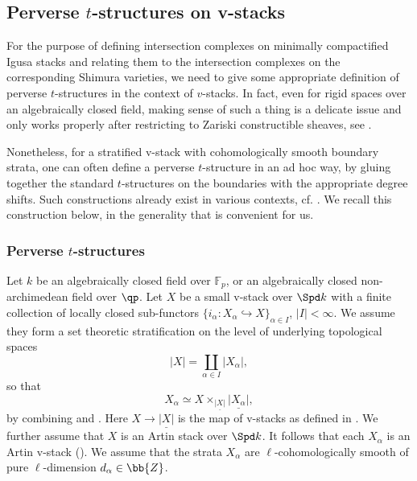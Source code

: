 \documentclass[letterpaper,11pt]{amsart}
\begin{document}
\subsection{Perverse $t$-structures on v-stacks}\label{sec: tStructureVstacks}
For the purpose of defining intersection complexes on minimally compactified Igusa stacks and relating them to the intersection complexes on the corresponding Shimura varieties, we need to give some appropriate definition of perverse $t$-structures in the context of $v$-stacks. In fact, even for rigid spaces over an algebraically closed field, making sense of such a thing is a delicate issue and only works properly after restricting to Zariski constructible sheaves, see \cite{BhattHanSixFunctors}.

Nonetheless, for a stratified v-stack with cohomologically smooth boundary strata, one can often define a perverse $t$-structure in an ad hoc way, by gluing together the standard $t$-structures on the boundaries with the appropriate degree shifts. Such constructions already exist in various contexts, cf. \cite[Definition/Proposition~VI.7.1]{FSGeomLLC}. We recall this construction below, in the generality that is convenient for us.

\subsubsection{Perverse \texorpdfstring{$t$-structures}{}}\label{subsub: PerverseSetup}
Let $k$ be an algebraically closed field over $\mathbb{F}_p$, or an algebraically closed non-archimedean field over $\qp$. Let $X$ be a small v-stack over $\Spd k$ with a finite collection of locally closed sub-functors $\{i_\alpha:X_\alpha\hookrightarrow X\}_{\alpha\in I}$, $|I|<\infty$.  We assume they form a set theoretic stratification on the level of underlying topological spaces
\[|X|=\coprod_{\alpha\in I} |X_\alpha|,\]
so that
\[X_\alpha\simeq X\times_{\underline{|X|}}\underline{|X_\alpha|},\]
by combining \cite[Lemma~2.7]{AGLRLocalModels} and \cite[Proposition~12.9]{Ecod}. Here $X\to \underline{|X|}$ is the map of v-stacks as defined in \cite[Page 7, Equation (2.4)]{AGLRLocalModels}. We further assume that $X$ is an Artin stack over $\Spd k$. It follows that each $X_\alpha$ is an Artin v-stack (\cite[Example~IV.1.9(iii)]{FSGeomLLC}).  We assume that the strata $X_{\alpha}$ are $\ell$-cohomologically smooth of pure $\ell$-dimension $d_{\alpha}\in \bb{Z}$.
\end{document}
